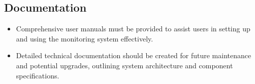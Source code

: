 \documentclass[12pt,a4paper]{report}
\begin{document}
\subsection{Documentation}
\begin{itemize}
  \item Comprehensive user manuals must be provided to assist users in setting up and using the monitoring system effectively.
  \item Detailed technical documentation should be created for future maintenance and potential upgrades, outlining system architecture and component specifications.
\end{itemize}






\end{document}
